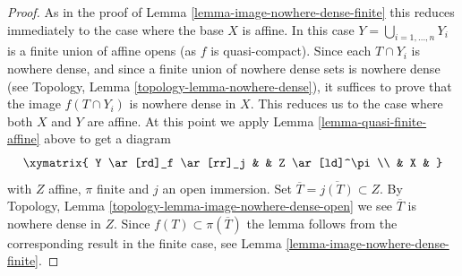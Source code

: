 \begin{proof}
As in the proof of Lemma \ref{lemma-image-nowhere-dense-finite} this
reduces immediately to the case where the base $X$ is affine.
In this case $Y = \bigcup_{i = 1, \ldots, n} Y_i$ is a finite union
of affine opens (as $f$ is quasi-compact). Since each $T \cap Y_i$
is nowhere dense, and since a finite union of nowhere dense sets is
nowhere dense (see
Topology, Lemma \ref{topology-lemma-nowhere-dense}),
it suffices to prove that the image $f(T \cap Y_i)$ is nowhere dense in $X$.
This reduces us to the case where both $X$ and $Y$ are affine. At this point
we apply Lemma \ref{lemma-quasi-finite-affine} above to get a diagram
$$
\xymatrix{
Y \ar[rd]_f \ar[rr]_j & & Z \ar[ld]^\pi \\
& X &
}
$$
with $Z$ affine, $\pi$ finite and $j$ an open immersion.
Set $\overline{T} = \overline{j(T)} \subset Z$. By
Topology, Lemma \ref{topology-lemma-image-nowhere-dense-open}
we see $\overline{T}$ is nowhere dense in $Z$.
Since $f(T) \subset \pi(\overline{T})$
the lemma follows from the corresponding result in the finite case, see
Lemma \ref{lemma-image-nowhere-dense-finite}.
\end{proof}




